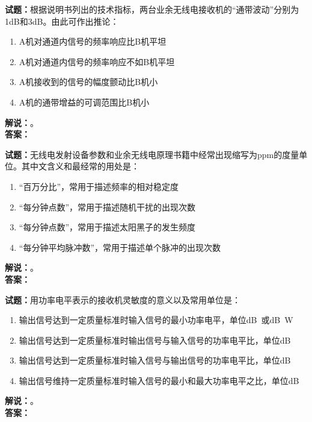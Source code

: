 \documentclass{ctexbook}
\begin{document}
\bigskip




\noindent\textbf{试题：}根据说明书列出的技术指标，两台业余无线电接收机的“通带波动”分别为1dB和3dB。由此可作出推论：
\begin{enumerate}[leftmargin=3em]
\item A机对通道内信号的频率响应比B机平坦
\item A机对通道内信号的频率响应不如B机平坦
\item A机接收到的信号的幅度颤动比B机小
\item A机的通带增益的可调范围比B机小
\end{enumerate}
\noindent\textbf{解说：}\textbf{}。\\\noindent\textbf{答案：}

\bigskip




\noindent\textbf{试题：}无线电发射设备参数和业余无线电原理书籍中经常出现缩写为ppm的度量单位。其中文含义和最经常的用处是：
\begin{enumerate}[leftmargin=3em]
\item “百万分比”，常用于描述频率的相对稳定度
\item “每分钟点数”，常用于描述随机干扰的出现次数
\item “每分钟点数”，常用于描述太阳黑子的发生频度
\item “每分钟平均脉冲数”，常用于描述单个脉冲的出现次数
\end{enumerate}
\noindent\textbf{解说：}\textbf{}。\\\noindent\textbf{答案：}

\bigskip




\noindent\textbf{试题：}用功率电平表示的接收机灵敏度的意义以及常用单位是：
\begin{enumerate}[leftmargin=3em]
\item 输出信号达到一定质量标准时输入信号的最小功率电平，单位\unit[qualifier-mode=combine]{\deci\bel{}}或\unit[qualifier-mode=combine]{\deci\bel{}}W
\item 输出信号达到一定质量标准时输出信号与输入信号的功率电平比，单位dB
\item 输出信号达到一定质量标准时输入信号与输出信号的功率电平比，单位dB
\item 输出信号维持一定质量标准时输入信号的最小和最大功率电平之比，单位dB
\end{enumerate}
\noindent\textbf{解说：}\textbf{}。\\\noindent\textbf{答案：}
\end{document}
